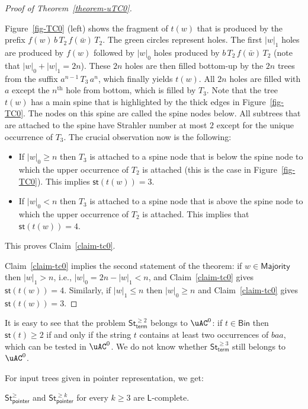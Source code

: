 \documentclass[a4paper,UKenglish,cleveref, autoref, thm-restate, numberwithinsect]{lipics-v2021}
\newcommand{\Bin}{\mathsf{Bin}}
\newcommand{\hs}{\mathsf{st}}
\newcommand{\LS}{\mathsf{L}}
\newcommand{\StN}{\mathsf{St}^\ge}
\newcommand{\StNpointer}{\StN_{\mathsf{pointer}}}
\begin{document}
\begin{proof}[Proof of Theorem~\ref{theorem-uTC0}]
\begin{claimproof}
 Figure~\ref{fig-TC0} (left) shows the fragment of $t(w)$ that is produced by the prefix $f(w) \, b  \, T_2  \, f(\bar{w})  \, T_2$. 
The green circles represent holes. The first $|w|_1$ holes are produced by $f(w)$ followed by $|w|_0$ holes produced by $b  \, T_2  \, f(\bar{w})  \, T_2$ (note that $|w|_0 +  |w|_1 = 2n$). 
These $2n$ holes are then filled bottom-up by the $2n$ trees from the suffix $a^{n-1}  \, T_3  \, a^n$, which
finally yields $t(w)$.
 All $2n$ holes are filled with $a$ except the $n^{\text{th}}$ hole from bottom, which is filled by $T_3$.
Note that the tree $t(w)$ has a main spine that is highlighted by the thick edges in Figure~\ref{fig-TC0}.
The nodes on this spine are called the spine nodes below.
All subtrees that are attached to the spine have Strahler number at most $2$ except for the unique occurrence of $T_3$.
The crucial observation now is the following:
\begin{itemize}
\item If $|w|_0 \ge n$ then 
$T_3$ is attached to a spine node that is below the spine node to which the upper occurrence of 
$T_2$ is attached (this is the case in Figure~\ref{fig-TC0}). 
This implies $\hs(t(w)) = 3$.
\item If $|w|_0 < n$ then $T_3$ is attached to a spine node that is above the spine node to which the upper occurrence of 
$T_2$ is attached. This implies that $\hs(t(w)) = 4$.  
\end{itemize} 
This proves Claim~\ref{claim-tc0}.
\end{claimproof}
 Claim~\ref{claim-tc0} implies the second statement of the theorem: if $w \in \mathsf{Majority}$ then 
 $|w|_1 > n$, i.e., $|w|_0 = 2n - |w|_1 < n$, and Claim~\ref{claim-tc0} gives $\hs(t(w)) = 4$.
 Similarly, if $|w|_1 \le n$ then $|w|_0 \geq n$ and Claim~\ref{claim-tc0} gives $\hs(t(w)) = 3$.
\end{proof}
It is easy to see that the problem $\mathsf{St}_{\mathsf{term}}^{\ge 2}$ belongs to $\uAC^0$: if $t \in \Bin$ then $\hs(t) \geq 2$ if and only
if the string $t$ contains at least two occurrences of $baa$, which can be tested in $\uAC^0$. We do not know whether $\mathsf{St}_{\mathsf{term}}^{\ge 3}$ still belongs to $\uAC^0$.

For input trees given in pointer representation, we get:

\begin{theorem} \label{thm-main-LS}
$\StNpointer$ and  $\mathsf{St}_{\mathsf{pointer}}^{\ge k}$ for every $k \geq 3$ are $\LS$-complete.
\end{theorem}
\end{document}
